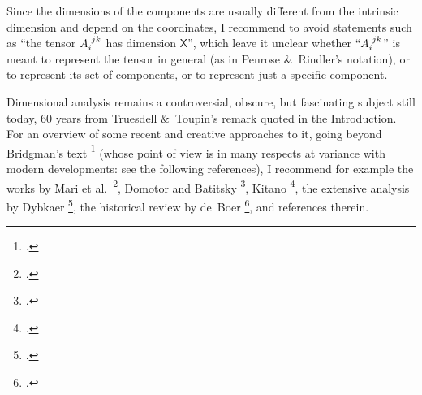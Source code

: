 \documentclass[\ifafour a4paper,12pt,\else a5paper,10pt,\fi%
onecolumn,oneside,article,%
british%
]{memoir}
\theoremstyle{remark}
\theoremstyle{innote}
\newcommand*{\citep}{\footcites}
\newcommand*{\amp}{\&}
\renewcommand*{\|}[1][]{\nonscript\,#1\vert\nonscript\;\mathopen{}}
\newcommand*{\sect}{\S}%
\newcommand*{\chap}{ch.}%
\newcommand*{\eqn}{eq.}%
\newcommand*{\eqns}{eqs}%
\newcommand*{\etal}{{et al.}}
\newcommand*{\Xx}{\textsf{X}}
\renewcommand*{\i}{\indices}
\begin{document}
Since the dimensions of the components are usually different from the
intrinsic dimension and depend on the coordinates, I recommend to avoid
statements such as \enquote{the tensor $A\i{_{i}^{jk}}$ has dimension
  $\Xx$}, which leave it unclear whether \enquote{$A\i{_{i}^{jk}}$} is
meant to represent the tensor in general (as in Penrose \amp\ Rindler's
notation), or to represent its set of components, or to represent just a
specific component.


\medskip

Dimensional analysis remains a controversial, obscure, but fascinating
subject still today, 60 years from Truesdell \amp\ Toupin's remark quoted
in the Introduction. For an overview of some recent and creative approaches
to it, going beyond Bridgman's text \citep{bridgman1922_r1963} (whose point
of view is in many respects at variance with modern developments: see the
following references), I recommend for example the works by Mari \etal\
\citep{marietal2012,frigerioetal2010}, Domotor and Batitsky
\citep{domotor2017,domotoretal2016,domotor2012}, Kitano \citep{kitano2013},
the extensive analysis by Dybkaer \citep{dybkaer2004_r2010}, the historical
review by de~Boer \citep{deboer1995}, and references therein.
















 
\end{document}
